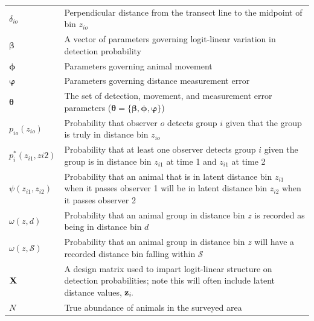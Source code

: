 \documentclass[aoas,preprint]{imsart}
\numberwithin{equation}{section}
\theoremstyle{plain}
\begin{document}
\begin{table}[ht]
\begin{tabular}{p{2cm}p{13cm}}
  $\delta_{io}$ & Perpendicular distance from the transect line to the midpoint of bin $z_{io}$ \\
  $\boldsymbol{\beta}$ & A vector of parameters governing logit-linear variation in detection probability \\
  $\boldsymbol{\phi}$ & Parameters governing animal movement \\
  $\boldsymbol{\varphi}$ & Parameters governing distance measurement error \\
  $\boldsymbol{\theta}$ & The set of detection, movement, and measurement error parameters ($\boldsymbol{\theta} = \{ \boldsymbol{\beta},\boldsymbol{\phi},\boldsymbol{\varphi} \}$) \\
  $p_{io}(z_{io})$ & Probability that observer $o$ detects group $i$ given that the group is truly in distance bin $z_{io}$\\
  $p_i^*(z_{i1},z{i2})$ & Probability that at least one observer detects group $i$ given the group is in distance bin $z_{i1}$ at time 1 and $z_{i1}$ at time 2\\
  $\psi(z_{i1},z_{i2})$ & Probability that an animal that is in latent distance bin $z_{i1}$ when it passes observer 1 will be in latent distance bin $z_{i2}$ when it passes observer 2 \\
  $\omega(z,d)$ & Probability that an animal group in distance bin $z$ is recorded as being in distance bin $d$ \\
  $\omega(z,\mathcal{S})$ & Probability that an animal group in distance bin $z$ will have a recorded distance bin falling within $\mathcal{S}$ \\
  ${\bf X}$ & A design matrix used to impart logit-linear structure on detection probabilities; note this will often include latent distance values, ${\bf z}_{i \cdot}$  \\
  $N$ & True abundance of animals in the surveyed area \\
\hline
\end{tabular}
\\
\end{table}
\end{document}

